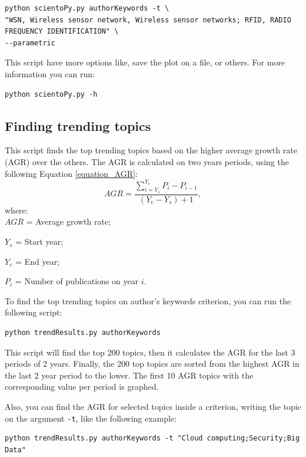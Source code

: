 \documentclass[10pt,letterpaper]{article}
\begin{document}
\begin{verbatim}
python scientoPy.py authorKeywords -t \
"WSN, Wireless sensor network, Wireless sensor networks; RFID, RADIO FREQUENCY IDENTIFICATION" \
--parametric
\end{verbatim}

This script have more options like, save the plot on a file, or others. For more information you can run:

\begin{verbatim}
python scientoPy.py -h
\end{verbatim}

\subsection{Finding trending topics}

This script finds the top trending topics based on the higher average growth rate (AGR) over the others. The AGR is calculated on two years periods, using the following Equation \eqref{equation_AGR}:
\begin{equation}
AGR = \frac{\sum\limits_{i = Y_s}^{Y_e}P_i - P_{i-1}}{(Y_e - Y_s)+1},  
\label{equation_AGR}
\end{equation}
where:\\
$AGR$ = Average growth rate;
	
	$Y_s$ = Start year;
	
	$Y_e$ = End year;
	
	$P_i$ = Number of publications on year $i.$
\newline


To find the top trending topics on author's keywords criterion, you can run the following script: 

\begin{verbatim}
python trendResults.py authorKeywords
\end{verbatim}

This script will find the top 200 topics, then it calculates the AGR for the last 3 periods of 2 years. Finally, the 200 top topics are sorted from the highest AGR in the last 2 year period to the lower. The first 10 AGR topics with the corresponding value per period is graphed. 

Also, you can find the AGR for selected topics inside a criterion, writing the topic on the argument \verb|-t|, like the following example: 

\begin{verbatim}
python trendResults.py authorKeywords -t "Cloud computing;Security;Big Data"
\end{verbatim}
\end{document}

